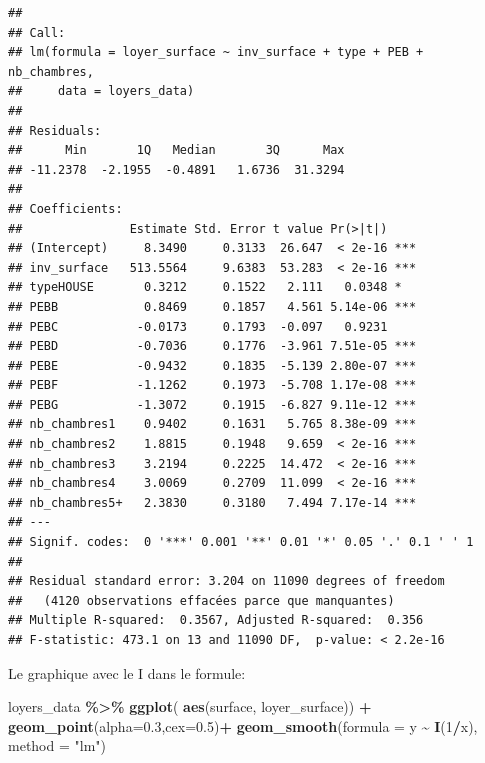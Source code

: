 \documentclass[
]{book}
\newenvironment{Shaded}{\begin{snugshade}}{\end{snugshade}}
\newcommand{\AttributeTok}[1]{\textcolor[rgb]{0.13,0.29,0.53}{#1}}
\newcommand{\DecValTok}[1]{\textcolor[rgb]{0.00,0.00,0.81}{#1}}
\newcommand{\FloatTok}[1]{\textcolor[rgb]{0.00,0.00,0.81}{#1}}
\newcommand{\FunctionTok}[1]{\textcolor[rgb]{0.13,0.29,0.53}{\textbf{#1}}}
\newcommand{\NormalTok}[1]{#1}
\newcommand{\SpecialCharTok}[1]{\textcolor[rgb]{0.81,0.36,0.00}{\textbf{#1}}}
\newcommand{\StringTok}[1]{\textcolor[rgb]{0.31,0.60,0.02}{#1}}
\begin{document}
\begin{verbatim}
## 
## Call:
## lm(formula = loyer_surface ~ inv_surface + type + PEB + nb_chambres, 
##     data = loyers_data)
## 
## Residuals:
##      Min       1Q   Median       3Q      Max 
## -11.2378  -2.1955  -0.4891   1.6736  31.3294 
## 
## Coefficients:
##               Estimate Std. Error t value Pr(>|t|)    
## (Intercept)     8.3490     0.3133  26.647  < 2e-16 ***
## inv_surface   513.5564     9.6383  53.283  < 2e-16 ***
## typeHOUSE       0.3212     0.1522   2.111   0.0348 *  
## PEBB            0.8469     0.1857   4.561 5.14e-06 ***
## PEBC           -0.0173     0.1793  -0.097   0.9231    
## PEBD           -0.7036     0.1776  -3.961 7.51e-05 ***
## PEBE           -0.9432     0.1835  -5.139 2.80e-07 ***
## PEBF           -1.1262     0.1973  -5.708 1.17e-08 ***
## PEBG           -1.3072     0.1915  -6.827 9.11e-12 ***
## nb_chambres1    0.9402     0.1631   5.765 8.38e-09 ***
## nb_chambres2    1.8815     0.1948   9.659  < 2e-16 ***
## nb_chambres3    3.2194     0.2225  14.472  < 2e-16 ***
## nb_chambres4    3.0069     0.2709  11.099  < 2e-16 ***
## nb_chambres5+   2.3830     0.3180   7.494 7.17e-14 ***
## ---
## Signif. codes:  0 '***' 0.001 '**' 0.01 '*' 0.05 '.' 0.1 ' ' 1
## 
## Residual standard error: 3.204 on 11090 degrees of freedom
##   (4120 observations effacées parce que manquantes)
## Multiple R-squared:  0.3567, Adjusted R-squared:  0.356 
## F-statistic: 473.1 on 13 and 11090 DF,  p-value: < 2.2e-16
\end{verbatim}

Le graphique avec le I dans le formule:

\begin{Shaded}
\begin{Highlighting}[]
\NormalTok{loyers\_data }\SpecialCharTok{\%\textgreater{}\%}
  \FunctionTok{ggplot}\NormalTok{( }\FunctionTok{aes}\NormalTok{(surface, loyer\_surface)) }\SpecialCharTok{+}
  \FunctionTok{geom\_point}\NormalTok{(}\AttributeTok{alpha=}\FloatTok{0.3}\NormalTok{,}\AttributeTok{cex=}\FloatTok{0.5}\NormalTok{)}\SpecialCharTok{+}
  \FunctionTok{geom\_smooth}\NormalTok{(}\AttributeTok{formula =}\NormalTok{ y }\SpecialCharTok{\textasciitilde{}} \FunctionTok{I}\NormalTok{(}\DecValTok{1}\SpecialCharTok{/}\NormalTok{x), }\AttributeTok{method =} \StringTok{"lm"}\NormalTok{)}
\end{Highlighting}
\end{Shaded}
\end{document}
